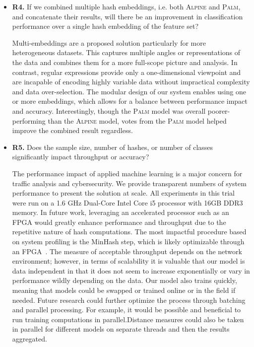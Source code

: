 \begin{itemize}
\item\textbf{R4.} If we combined multiple hash embeddings, i.e. both \textsc{Alpine} and \textsc{Palm}, and concatenate their results, will there be an improvement in classification performance over a single hash embedding of the feature set?

Multi-embeddings are a proposed solution particularly for more heterogeneous datasets. This captures multiple angles or representations of the data and combines them for a more full-scope picture and analysis. In contrast, regular expressions provide only a one-dimensional viewpoint and are incapable of encoding highly variable data without impractical complexity and data over-selection. The modular design of our system enables using one or more embeddings, which allows for a balance between performance impact and accuracy. Interestingly, though the \textsc{Palm} model was overall poorer-performing than the \textsc{Alpine} model, votes from the \textsc{Palm} model helped improve the combined result regardless.

\item\textbf{R5.} Does the sample size, number of hashes, or number of classes significantly impact throughput or accuracy?

The performance impact of applied machine learning is a major concern for traffic analysis and cybersecurity. We provide transparent numbers of system performance to present the solution at scale. All experiments in this trial were run on a 1.6 GHz Dual-Core Intel Core i5 processor with 16GB DDR3 memory. In future work, leveraging an accelerated processor such as an FPGA would greatly enhance performance and throughput due to the repetitive nature of hash computations. The most impactful procedure based on system profiling is the MinHash step, which is likely optimizable through an FPGA~\cite{fpga}. The measure of acceptable throughput depends on the network environment; however, in terms of scalability it is valuable that our model is data independent in that it does not seem to increase exponentially or vary in performance wildly depending on the data. Our model also trains quickly, meaning that models could be swapped or trained online or in the field if needed. Future research could further optimize the process through batching and parallel processing. For example, it would be possible and beneficial to run training computations in parallel.Distance measures could also be taken in parallel for different models on separate threads and then the results aggregated.


\end{itemize}
